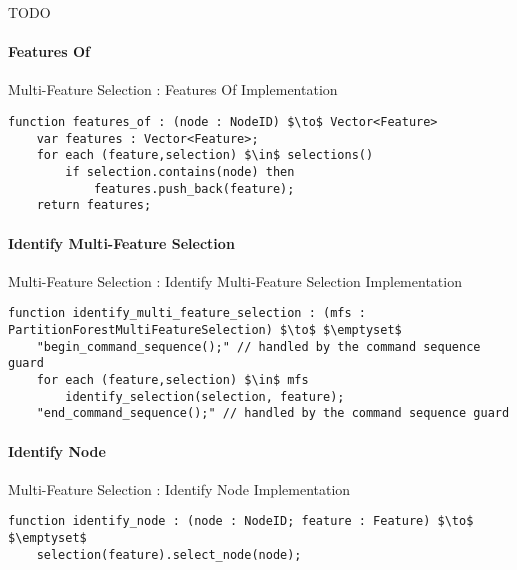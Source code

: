 TODO

\paragraph{Features Of}

\begin{stulisting}[H]
\caption{Multi-Feature Selection : Features Of Implementation}
\begin{lstlisting}[style=Default]
function features_of : (node : NodeID) $\to$ Vector<Feature>
	var features : Vector<Feature>;
	for each (feature,selection) $\in$ selections()
		if selection.contains(node) then
			features.push_back(feature);
	return features;
\end{lstlisting}
\end{stulisting}

\paragraph{Identify Multi-Feature Selection}

\begin{stulisting}[H]
\caption{Multi-Feature Selection : Identify Multi-Feature Selection Implementation}
\begin{lstlisting}[style=Default]
function identify_multi_feature_selection : (mfs : PartitionForestMultiFeatureSelection) $\to$ $\emptyset$
	"begin_command_sequence();" // handled by the command sequence guard
	for each (feature,selection) $\in$ mfs
		identify_selection(selection, feature);
	"end_command_sequence();" // handled by the command sequence guard
\end{lstlisting}
\end{stulisting}

\paragraph{Identify Node}

\begin{stulisting}[H]
\caption{Multi-Feature Selection : Identify Node Implementation}
\begin{lstlisting}[style=Default]
function identify_node : (node : NodeID; feature : Feature) $\to$ $\emptyset$
	selection(feature).select_node(node);
\end{lstlisting}
\end{stulisting}

